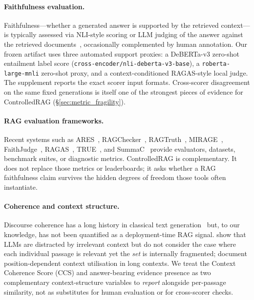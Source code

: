 \paragraph{Faithfulness evaluation.} Faithfulness---whether a generated
answer is supported by the retrieved context---is typically assessed
via NLI-style scoring or LLM judging of the answer against the retrieved
documents~\citep{honovich2022true,laban2022summac,es2024ragas},
occasionally complemented by human annotation. Our frozen artifact uses
three automated support proxies: a DeBERTa-v$3$ zero-shot entailment
label score (\texttt{cross-encoder/nli-deberta-v3-base}), a
\texttt{roberta-large-mnli} zero-shot proxy, and a context-conditioned
RAGAS-style local judge. The supplement reports the exact scorer input
formats. Cross-scorer disagreement on the same fixed generations is
itself one of the strongest pieces of evidence for ControlledRAG
(\S\ref{sec:metric_fragility}).

\paragraph{RAG evaluation frameworks.} Recent systems such as
ARES~\citep{saadfalcon2024ares}, RAGChecker~\citep{ru2024ragchecker},
RAGTruth~\citep{niu2024ragtruth}, MIRAGE~\citep{park2025mirage},
FaithJudge~\citep{tamber2025faithjudge}, RAGAS~\citep{es2024ragas},
TRUE~\citep{honovich2022true}, and SummaC~\citep{laban2022summac}
provide evaluators, datasets, benchmark suites, or diagnostic metrics.
ControlledRAG is complementary. It does not replace those metrics or
leaderboards; it asks whether a RAG faithfulness claim survives the
hidden degrees of freedom those tools often instantiate.

\paragraph{Coherence and context structure.} Discourse coherence has a
long history in classical text
generation~\citep{li2014coherence,mesgar2018neural,nguyen2021conditional}
but, to our knowledge, has not been quantified as a deployment-time
RAG signal. \citet{shi2023large} show that LLMs are distracted by
irrelevant context but do not consider the case where each individual
passage is relevant yet the \emph{set} is internally fragmented;
\citet{liu2024lostmiddle} document position-dependent context
utilisation in long contexts. We treat the Context Coherence Score
(CCS) and answer-bearing evidence presence as two complementary
context-structure variables to \emph{report} alongside per-passage
similarity, not as substitutes for human evaluation or for cross-scorer
checks.

